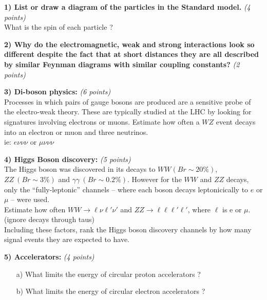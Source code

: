 {\large

\textbf{1) List or draw a diagram of the particles in the Standard model. } \hfill \textit{(4 points)}\\
What is the spin of each particle ?

\vspace*{0.5in}


\textbf{2) Why do the electromagnetic, weak and strong interactions look so different despite the fact that at short distances they are all described by similar Feynman diagrams with similar coupling constants?} \hfill \textit{(2 points)}\\

\vspace{0.5in}

\textbf{3) Di-boson physics:  } \hfill \textit{(6 points)}\\
Processes in which pairs of gauge bosons are produced are a sensitive probe of the electro-weak theory. These are typically studied at the LHC by looking for signatures involving electrons or muons.  
Estimate how often a $WZ$ event decays into an electron or muon and three neutrinos.\\ ie: $e\nu\nu\nu$ or $\mu\nu\nu\nu$

\vspace{0.5in}

\textbf{4) Higgs Boson discovery: } \hfill \textit{(5 points)}\\
The Higgs boson was discovered in its decays to $WW (Br\sim20\%)$, $ZZ\ (Br\sim3\%)$ and $\gamma\gamma\ (Br\sim0.2\%)$.
However for the $WW$ and $ZZ$ decays, only the ``fully-leptonic'' channels -- where each boson decays leptonicically to $e$ or $\mu$ -- were used. \\

Estimate how often $WW \rightarrow \ell\nu\ell'\nu'$ and $ZZ\rightarrow\ell\ell\ell'\ell'$, where $\ell$ is e or $\mu$. (ignore decays through taus)\\

Including these factors, rank the Higgs boson discovery channels by how many signal events they are expected to have.

\vspace{0.5in}

\textbf{5) Accelerators: } \hfill \textit{(4 points)}\\
\begin{itemize}
\item[a)]{What limits the energy of circular proton accelerators ?
}
\item[b)]{What limits the energy of circular electron accelerators ?
}
\end{itemize}

}
